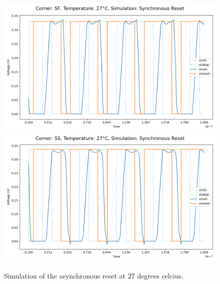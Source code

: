 \begin{figure}[H]
    \vspace{5pt}
    \includegraphics[height= 0.21\textheight]{figures/aimspice/SF/27/W3.csv.png}
    \vspace{5pt}
    \includegraphics[height= 0.21\textheight]{figures/aimspice/SS/27/W3.csv.png}
    \caption{Simulation of the asynchronous reset at 27 degrees celcius.}
    \label{fig:aimspice_W3_27}
\end{figure}

\pagebreak

